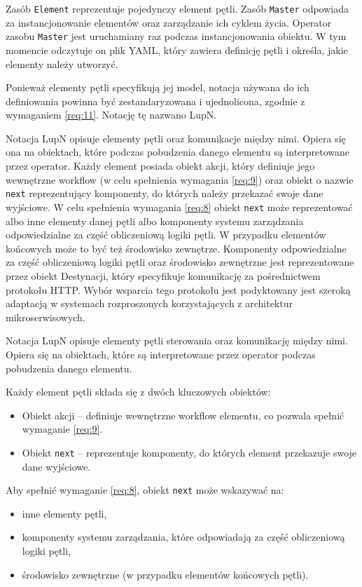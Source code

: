 Zasób \texttt{Element} reprezentuje pojedynczy element pętli.
Zasób \texttt{Master} odpowiada za instancjonowanie elementów oraz zarządzanie ich cyklem życia.
Operator zasobu \texttt{Master} jest uruchamiany raz podczas instancjonowania obiektu. W tym momencie odczytuje on plik YAML, który zawiera definicję pętli i określa, jakie elementy należy utworzyć.

Ponieważ elementy pętli specyfikują jej model, notacja używana do ich definiowania powinna być zestandaryzowana i ujednolicona, zgodnie z wymaganiem \ref{req:11}. Notację tę nazwano LupN.

Notacja LupN opisuje elementy pętli oraz komunikacje między nimi. Opiera się ona na obiektach, które podczas pobudzenia danego elementu są interpretowane przez operator. Każdy element posiada obiekt akcji, który definiuje jego wewnętrzne workflow (w celu spełnienia wymagania \ref{req:9}) oraz obiekt o nazwie \texttt{next} reprezentujący komponenty, do których należy przekazać swoje dane wyjściowe. W celu spełnienia wymagania \ref{req:8} obiekt \texttt{next} może reprezentować albo inne elementy danej pętli albo komponenty systemu zarządzania odpowiedzialne za część obliczeniową logiki pętli. W przypadku elementów końcowych może to być też środowisko zewnętrze. Komponenty odpowiedzialne za część obliczeniową logiki pętli oraz środowisko zewnętrzne jest reprezentowane przez obiekt Destynacji, który specyfikuje komunikację za pośrednictwem protokołu HTTP. Wybór wsparcia tego protokołu jest podyktowany jest szeroką adaptacją w systemach rozproszonych korzystających z architektur mikroserwisowych.

Notacja LupN opisuje elementy pętli sterowania oraz komunikację między nimi. Opiera się na obiektach, które są interpretowane przez operator podczas pobudzenia danego elementu.

Każdy element pętli składa się z dwóch kluczowych obiektów:
\begin{itemize}
    \item Obiekt akcji – definiuje wewnętrzne workflow elementu, co pozwala spełnić wymaganie \ref{req:9}.
    \item Obiekt \texttt{next} – reprezentuje komponenty, do których element przekazuje swoje dane wyjściowe.
\end{itemize}

Aby spełnić wymaganie \ref{req:8}, obiekt \texttt{next} może wskazywać na:
\begin{itemize}
    \item inne elementy pętli,
    \item komponenty systemu zarządzania, które odpowiadają za część obliczeniową logiki pętli,
    \item środowisko zewnętrzne (w przypadku elementów końcowych pętli).
\end{itemize}


